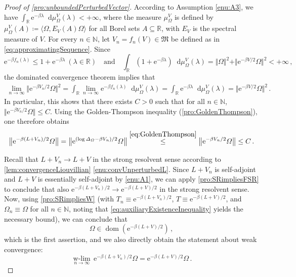 \documentclass[a4paper, twoside, 11pt, reqno]{amsart}
\theoremstyle{definition}
\theoremstyle{plain}
\renewcommand{\subset}{\subseteq}
\renewcommand{\Delta}{\varDelta}
\renewcommand{\Omega}{\varOmega}
\newcommand{\N}{\mathbb{N}}
\newcommand{\R}{\mathbb{R}}
\newcommand{\MFM}{\mathfrak{M}}
\newcommand{\ee}{\mathrm{e}}
\newcommand{\1}{\mathbf{1}}
\newcommand{\diff}{\mathop{}\!\mathrm{d}}
\newcommand{\dlim}[2]{\operatorname*{\text{$#1$}-lim}_{#2}\,}
\DeclareMathOperator{\dom}{dom}
\newcommand{\norm}[2][]{#1\Vert{#2}#1\Vert}
\newcommand{\braket}[2][]{#1\langle{#2}#1\rangle}
\newcommand{\ce}{\coloneqq}
\begin{document}
\begin{proof}[Proof of \cref{pro:unboundedPerturbedVector}]
    According to Assumption \ref{enu:A3}, we have $\int_\R \ee^{- \beta \lambda} \diff \mu_\Omega^V(\lambda) < + \infty$, where the measure $\mu_\Omega^V$ is defined by $\mu_\Omega^V (A) \ce \braket{\Omega, E_V(A) \Omega}$ for all Borel sets $A \subset \R$, with $E_V$ is the spectral measure of $V$. For every $n \in \N$, let $V_n = f_n(V) \in \MFM$ be defined as in \cref{eq:approximatingSequence}. Since
    \begin{equation*}
        \ee^{- \beta f_n(\lambda)} \le 1 + \ee^{- \beta \lambda} \ (\lambda \in \R) \quad \text{and} \quad \int_\R (1 + \ee^{- \beta \lambda}) \diff \mu_\Omega^V(\lambda) = \norm{\Omega}^2 + \norm{\ee^{-\beta V / 2} \Omega}^2 < + \infty \, ,
    \end{equation*}
    the dominated convergence theorem implies that
    \begin{align*}
        \lim_{n \to \infty} \norm[\big]{\ee^{- \beta V_n / 2} \Omega}^2 = \int_\R \lim_{n \to \infty} \ee^{- \beta f_n(\lambda)} \diff \mu_\Omega^V(\lambda) = \int_\R \ee^{- \beta \lambda} \diff \mu_\Omega^V(\lambda) = \norm[\big]{\ee^{- \beta V / 2} \Omega}^2 \, .
    \end{align*}   
    In particular, this shows that there exists $C > 0$ such that for all $n \in \N$, $\norm{\ee^{- \beta V_n / 2} \Omega} \le C$. Using the Golden-Thompson inequality (\cref{pro:GoldenThompson}), one therefore obtains
    \begin{equation}\label{eq:auxiliaryExistenceInequality}
        \norm[\big]{\ee^{- \beta (L + V_n) / 2} \Omega} = \norm[\big]{\ee^{(\log \Delta_\Omega - \beta  V_n) / 2} \Omega} \overset{\eqref{eq:GoldenThompson}}{\le} \norm[\big]{\ee^{- \beta  V_n / 2} \Omega} \le C \, .
    \end{equation}

    Recall that $L + V_n \to L + V$ in the strong resolvent sense according to \cref{lem:convergenceLiouvillian} \ref{enu:convUnperturbedL}. Since $L + V_n$ is self-adjoint and $L + V$ is essentially self-adjoint by \ref{enu:A1}, we can apply \cref{pro:SRimpliesFSR} to conclude that also $\ee^{- \beta (L + V_n) / 2} \to \ee^{- \beta (L + V) / 2}$ in the strong resolvent sense. Now, using \cref{pro:SRimpliesW} (with $T_n \equiv \ee^{- \beta (L + V_n) / 2}$, $T \equiv \ee^{- \beta (L + V) / 2}$, and $\Omega_n \equiv \Omega$ for all $n \in \N$, noting that \cref{eq:auxiliaryExistenceInequality} yields the necessary bound), we can conclude that
    \begin{equation*}
        \Omega \in \dom(\ee^{- \beta (L + V) / 2}) \, ,
    \end{equation*}
    which is the first assertion, and we also directly obtain the statement about weak convergence:
    \begin{equation*}
        \dlim{w}{n \to \infty} \ee^{- \beta (L + V_n) / 2} \Omega = \ee^{- \beta (L + V) / 2} \Omega \, . \tag*{\qedhere}
    \end{equation*}
\end{proof}
\end{document}
